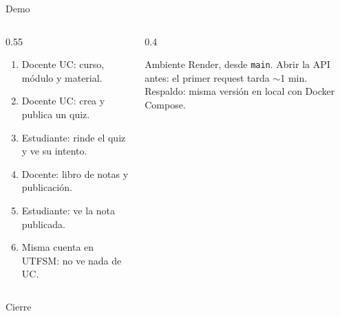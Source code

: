 \documentclass[aspectratio=169,10pt]{beamer}
\begin{document}
\begin{frame}{Demo}
\begin{columns}[T,onlytextwidth]
\begin{column}{0.55\textwidth}
\small
\begin{enumerate}
  \item Docente UC: curso, módulo y material.
  \item Docente UC: crea y publica un quiz.
  \item Estudiante: rinde el quiz y ve su intento.
  \item Docente: libro de notas y publicación.
  \item Estudiante: ve la nota publicada.
  \item Misma cuenta en UTFSM: no ve nada de UC.
\end{enumerate}
\end{column}
\begin{column}{0.4\textwidth}
\begin{block}{Ambiente}
\scriptsize
Render, desde \texttt{main}. Abrir la API antes: el primer request tarda $\sim$1 min.\\[0.1cm]
Respaldo: misma versión en local con Docker Compose.
\end{block}
\end{column}
\end{columns}
\end{frame}

\begin{frame}{Cierre}
\centering
{}
\end{frame}
\end{document}

